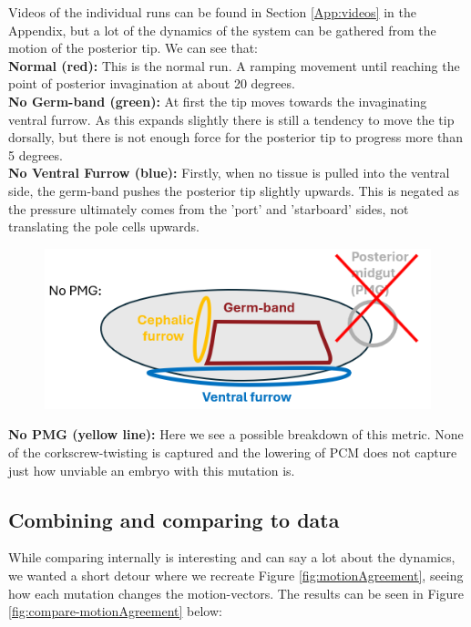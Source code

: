 Videos of the individual runs can be found in Section \ref{App:videos} in the Appendix, but a lot of the dynamics of the system can be gathered from the motion of the posterior tip. We can see that:\\
\textbf{Normal (red):} This is the normal run. A ramping movement until reaching the point of posterior invagination at about 20 degrees. \\
\textbf{No Germ-band (green):} At first the tip moves towards the invaginating ventral furrow. As this expands slightly there is still a tendency to move the tip dorsally, but there is not enough force for the posterior tip to progress more than 5 degrees. \\
\textbf{No Ventral Furrow (blue):} Firstly, when no tissue is pulled into the ventral side, the germ-band pushes the posterior tip slightly upwards. This is negated as the pressure ultimately comes from the 'port' and 'starboard' sides, not translating the pole cells upwards.\\
\begin{figure}
    \centering
    \hspace{-3cm}
    \includegraphics[width=0.5\linewidth]{chapters//Results/no_pmg_mutant_schematic.png}
\end{figure}
\textbf{No PMG (yellow line):} Here we see a possible breakdown of this metric. None of the corkscrew-twisting is captured and the lowering of PCM does not capture just how unviable an embryo with this mutation is.  


\subsection{Combining and comparing to data}
While comparing internally is interesting and can say a lot about the dynamics, we wanted a short detour where we recreate Figure \ref{fig:motionAgreement}, seeing how each mutation changes the motion-vectors. The results can be seen in Figure \ref{fig:compare-motionAgreement} below:

